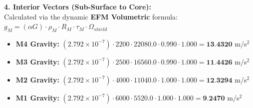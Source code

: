 \documentclass[11pt, a4paper]{article}
\begin{document}
  \vspace{0.5em}
  \noindent \textbf{4. Interior Vectors (Sub-Surface to Core):} \\[0.5em]
  \hspace*{1em} Calculated via the dynamic \textbf{EFM Volumetric} formula: $g_M = (\alpha G) \cdot \rho_{M} \cdot R_M \cdot \tau_M \cdot \Omega_{shield}$
  \begin{itemize}
    \item \textbf{M4 Gravity:} $(2.792 \times 10^{-7}) \cdot 2200 \cdot 22080.0 \cdot 0.990 \cdot 1.000 = \textbf{13.4320}$ m/s$^2$
    \item \textbf{M3 Gravity:} $(2.792 \times 10^{-7}) \cdot 2500 \cdot 16560.0 \cdot 0.990 \cdot 1.000 = \textbf{11.4426}$ m/s$^2$
    \item \textbf{M2 Gravity:} $(2.792 \times 10^{-7}) \cdot 4000 \cdot 11040.0 \cdot 1.000 \cdot 1.000 = \textbf{12.3294}$ m/s$^2$
    \item \textbf{M1 Gravity:} $(2.792 \times 10^{-7}) \cdot 6000 \cdot 5520.0 \cdot 1.000 \cdot 1.000 = \textbf{9.2470}$ m/s$^2$
  \end{itemize}
\end{document}
